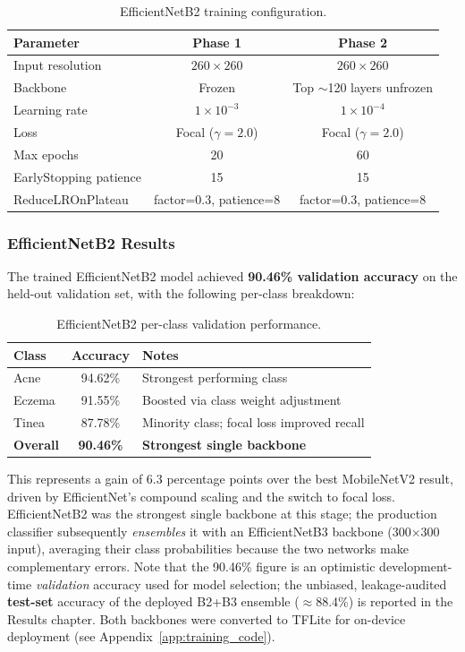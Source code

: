 \begin{table}[H]
\centering
\caption{EfficientNetB2 training configuration.}
\label{tab:b2_config}
\begin{tabular}{|l|c|c|}
\hline
\textbf{Parameter} & \textbf{Phase 1} & \textbf{Phase 2} \\ \hline
Input resolution & $260 \times 260$ & $260 \times 260$ \\ \hline
Backbone & Frozen & Top $\sim$120 layers unfrozen \\ \hline
Learning rate & $1 \times 10^{-3}$ & $1 \times 10^{-4}$ \\ \hline
Loss & Focal ($\gamma = 2.0$) & Focal ($\gamma = 2.0$) \\ \hline
Max epochs & 20 & 60 \\ \hline
EarlyStopping patience & 15 & 15 \\ \hline
ReduceLROnPlateau & factor=0.3, patience=8 & factor=0.3, patience=8 \\ \hline
\end{tabular}
\end{table}

\subsubsection{EfficientNetB2 Results}

The trained EfficientNetB2 model achieved \textbf{90.46\% validation accuracy} on the held-out validation set, with the following per-class breakdown:

\begin{table}[H]
\centering
\caption{EfficientNetB2 per-class validation performance.}
\label{tab:b2_results}
\begin{tabular}{|l|c|l|}
\hline
\textbf{Class} & \textbf{Accuracy} & \textbf{Notes} \\ \hline
Acne & 94.62\% & Strongest performing class \\ \hline
Eczema & 91.55\% & Boosted via class weight adjustment \\ \hline
Tinea & 87.78\% & Minority class; focal loss improved recall \\ \hline
\textbf{Overall} & \textbf{90.46\%} & \textbf{Strongest single backbone} \\ \hline
\end{tabular}
\end{table}

This represents a gain of 6.3 percentage points over the best MobileNetV2 result, driven by EfficientNet's compound scaling and the switch to focal loss. EfficientNetB2 was the strongest single backbone at this stage; the production classifier subsequently \emph{ensembles} it with an EfficientNetB3 backbone (300$\times$300 input), averaging their class probabilities because the two networks make complementary errors. Note that the 90.46\% figure is an optimistic development-time \emph{validation} accuracy used for model selection; the unbiased, leakage-audited \textbf{test-set} accuracy of the deployed B2+B3 ensemble ($\approx$88.4\%) is reported in the Results chapter. Both backbones were converted to TFLite for on-device deployment (see Appendix~\ref{app:training_code}).


